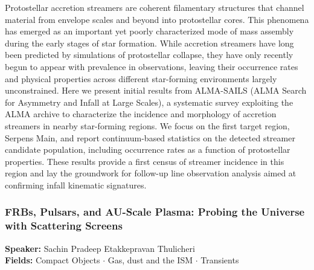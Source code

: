 Protostellar accretion streamers are coherent filamentary structures that channel material from envelope scales and beyond into protostellar cores. This phenomena has emerged as an important yet poorly characterized mode of mass assembly during the early stages of star formation. While accretion streamers have long been predicted by simulations of protostellar collapse, they have only recently begun to appear with prevalence in observations, leaving their occurrence rates and physical properties across different star-forming environments largely unconstrained. Here we present initial results from ALMA-SAILS (ALMA Search for Asymmetry and Infall at Large Scales), a systematic survey exploiting the ALMA archive to characterize the incidence and morphology of accretion streamers in nearby star-forming regions. We focus on the first target region, Serpens Main, and report continuum-based statistics on the detected streamer candidate population, including occurrence rates as a function of protostellar properties. These results provide a first census of streamer incidence in this region and lay the groundwork for follow-up line observation analysis aimed at confirming infall kinematic signatures.

\hypertarget{abstract-talk-164}{}\label{abstract-page-talk-164}
\subsubsection*{FRBs, Pulsars, and AU-Scale Plasma: Probing the Universe with Scattering Screens}
\textbf{Speaker:} Sachin Pradeep Etakkepravan Thulicheri\\
\textbf{Fields:} Compact Objects $\cdot$ Gas, dust and the ISM $\cdot$ Transients

